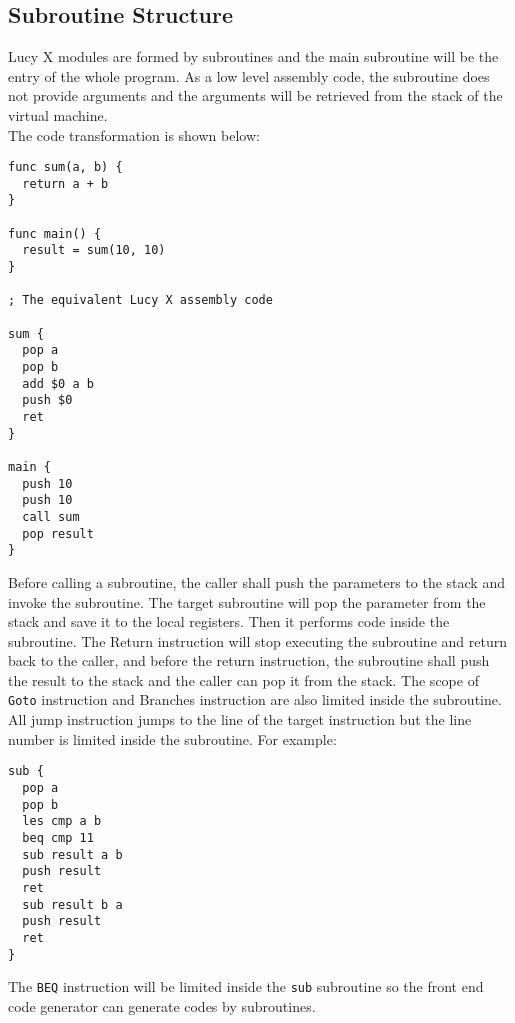 \subsection{Subroutine Structure}
Lucy X modules are formed by subroutines and the main subroutine will be the entry of the whole program. As a low level assembly code, the subroutine does not provide arguments and the arguments will be retrieved from the stack of the virtual machine. \\
The code transformation is shown below:
\begin{lstlisting}[language=LucyX]
func sum(a, b) {
  return a + b
}

func main() {
  result = sum(10, 10)
}

; The equivalent Lucy X assembly code

sum {
  pop a
  pop b
  add $0 a b
  push $0
  ret
}

main {
  push 10
  push 10
  call sum
  pop result
}
\end{lstlisting}
Before calling a subroutine, the caller shall push the parameters to the stack and invoke the subroutine. The target subroutine will pop the parameter from the stack and save it to the local registers. Then it performs code inside the subroutine. The Return instruction will stop executing the subroutine and return back to the caller, and before the return instruction, the subroutine shall push the result to the stack and the caller can pop it from the stack.
The scope of \texttt{Goto} instruction and Branches instruction are also limited inside the subroutine. All jump instruction jumps to the line of the target instruction but the line number is limited inside the subroutine. For example:
\begin{lstlisting}[language=LucyX]
sub {
  pop a
  pop b
  les cmp a b
  beq cmp 11
  sub result a b
  push result
  ret
  sub result b a
  push result
  ret
}
\end{lstlisting}
The \texttt{BEQ} instruction will be limited inside the \texttt{sub} subroutine so the front end code generator can generate codes by subroutines.
